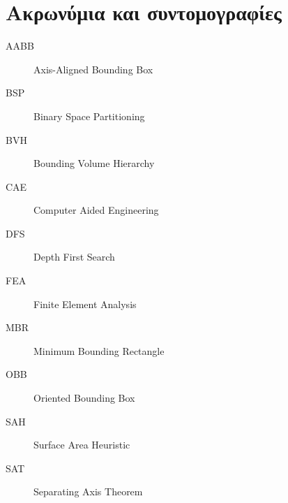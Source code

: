 \chapter{Ακρωνύμια και συντομογραφίες}

\begin{description}
  \item[AABB] Axis-Aligned Bounding Box
  \item[BSP] Binary Space Partitioning
  \item[BVH] Bounding Volume Hierarchy
  \item[CAE] Computer Aided Engineering
  \item[DFS] Depth First Search
  \item[FEA] Finite Element Analysis
  \item[MBR] Minimum Bounding Rectangle
  \item[OBB] Oriented Bounding Box
  \item[SAH] Surface Area Heuristic
  \item[SAT] Separating Axis Theorem 
\end{description}
